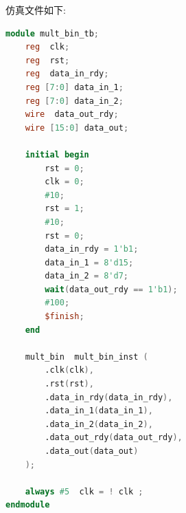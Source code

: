\documentclass{article}
\begin{document}
仿真文件如下:
\begin{lstlisting}[language=Verilog, caption={仿真文件}]
module mult_bin_tb;
    reg  clk;
    reg  rst;
    reg  data_in_rdy;
    reg [7:0] data_in_1;
    reg [7:0] data_in_2;
    wire  data_out_rdy;
    wire [15:0] data_out;

    initial begin
        rst = 0;
        clk = 0;
        #10;
        rst = 1;
        #10;
        rst = 0;
        data_in_rdy = 1'b1;
        data_in_1 = 8'd15;
        data_in_2 = 8'd7;
        wait(data_out_rdy == 1'b1);
        #100;
        $finish;
    end

    mult_bin  mult_bin_inst (
        .clk(clk),
        .rst(rst),
        .data_in_rdy(data_in_rdy),
        .data_in_1(data_in_1),
        .data_in_2(data_in_2),
        .data_out_rdy(data_out_rdy),
        .data_out(data_out)
    );

    always #5  clk = ! clk ;
endmodule
\end{lstlisting}
\end{document}
